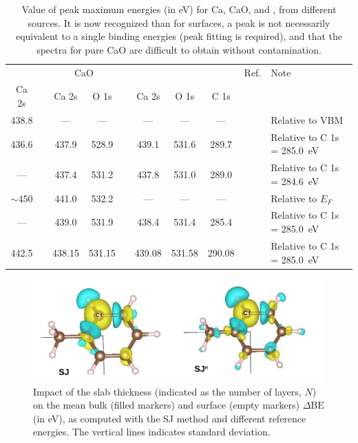 \documentclass[journal=jpccck,manuscript=article]{achemso}
\def\dbe{\ensuremath{\Delta\text{BE}}}
\begin{document}
\begin{table}[!h]
	\begin{tabular}{c ccc c ccc cl}
		\toprule
		\ce{Ca^0} & & \multicolumn{2}{c}{CaO} & & \multicolumn{3}{c}{\ce{CaCO3}} & Ref. & Note\\
		\cline{1-1} \cline{3-4} \cline{6-8}
		Ca 2s & & Ca 2s & O 1s  & & Ca 2s & O 1s & C 1s\\
		\midrule
		438.8 & &---&---&& --- & --- &--- & \citenum{fuggleCorelevelBindingEnergies1980} & Relative to VBM\\
		436.6 & & 437.9 & 528.9& & 439.1 &531.6 & 289.7& \citenum{sosulnikovXrayPhotoelectronStudies1992}& Relative to C 1s = \SI{285.0}{\electronvolt}\\
		 --- && 437.4 & 531.2&& 437.8 & 531.0 & 289.0 & \citenum{demriXPSStudyCalcium1995} & Relative to C 1s = \SI{284.6}{\electronvolt}\\
		 $\sim$450 & & 441.0 & 532.2 & & --- & --- & --- & \citenum{ochsCO2ChemisorptionCa1998} & Relative to $E_F$ \\
		 --- & & 439.0 & 531.9 & & 438.4 & 531.4 & 285.4 & \citenum{cristHandbookMonochromaticXPS2000a} & Relative to C 1s = \SI{285.0}{\electronvolt}\\
		 442.5 & & 438.15 & 531.15 & & 439.08 & 531.58 & 290.08 & \citenum{cristXPSLibraryWebsite2021a} & Relative to C 1s = \SI{285.0}{\electronvolt}\\
		\bottomrule
	\end{tabular}
	\caption{Value of peak maximum energies  (in \si{\electronvolt}) for Ca, CaO, and  , from different sources. It is now recognized than for surfaces, a peak is not necessarily equivalent to a single binding energies (peak fitting is required), and that the spectra for pure CaO are difficult to obtain without contamination.\cite{dupinSystematicXPSStudies2000}}
\end{table}

\begin{figure}[!h]
\centering
\includegraphics[width=\linewidth]{FigureS3}
\caption{Impact of the slab thickness (indicated as the number of layers, $N$) on the mean bulk (filled markers)  and surface (empty markers) \dbe{} (in \si{\electronvolt}), as computed with the SJ method and different reference energies. The vertical lines indicates standard deviation.}
\label{fig:slabsthicknessSJ}
\end{figure}
\end{document}
